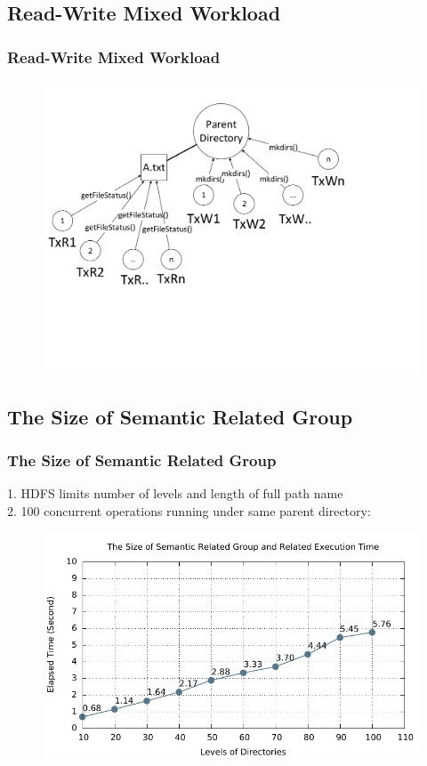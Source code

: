 \documentclass{beamer}
\begin{document}
\subsection{Read-Write Mixed Workload}
\begin{frame}
	\frametitle{Read-Write Mixed Workload}
	\begin{figure}[ht]
		\centering
		\includegraphics[width=\linewidth]{figs/rw.pdf}
	\end{figure}
\end{frame}

\subsection{The Size of Semantic Related Group}
\begin{frame}
	\frametitle{The Size of Semantic Related Group}
	1. HDFS limits number of levels and length of full path name \\
	2. 100 concurrent operations running under same parent directory:
	\begin{figure}[ht]
		\centering
		\includegraphics[width=\linewidth]{figs/srgSize.pdf}
	\end{figure}
\end{frame}
\end{document}
